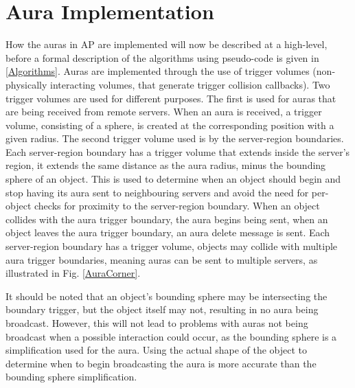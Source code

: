 \section{Aura Implementation}
How the auras in AP are implemented will now be described at a high-level, before a formal description of the algorithms using pseudo-code is given in \ref{Algorithms}.
Auras are implemented through the use of trigger volumes (non-physically interacting volumes, that generate trigger collision callbacks). Two trigger volumes are used for different purposes. 
The first is used for auras that are being received from remote servers. When an aura is received, a trigger volume, consisting of a sphere, is created at the corresponding position with a given radius. The second trigger volume used is by the server-region boundaries. Each server-region boundary has a trigger volume that extends inside the server's region, it extends the same distance as the aura radius, minus the bounding sphere of an object. This is used to determine when an object should begin and stop having its aura sent to neighbouring servers and avoid the need for per-object checks for proximity to the server-region boundary. When an object collides with the aura trigger boundary, the aura begins being sent, when an object leaves the aura trigger boundary, an aura delete message is sent.
Each server-region boundary has a trigger volume, objects may collide with multiple aura trigger boundaries, meaning auras can be sent to multiple servers, as illustrated in Fig. \ref{AuraCorner}.

It should be noted that an object's bounding sphere may be intersecting the boundary trigger, but the object itself may not, resulting in no aura being broadcast. However, this will not lead to problems with auras not being broadcast when a possible interaction could occur, as the bounding sphere is a simplification used for the aura. Using the actual shape of the object to determine when to begin broadcasting the aura is more accurate than the bounding sphere simplification.

